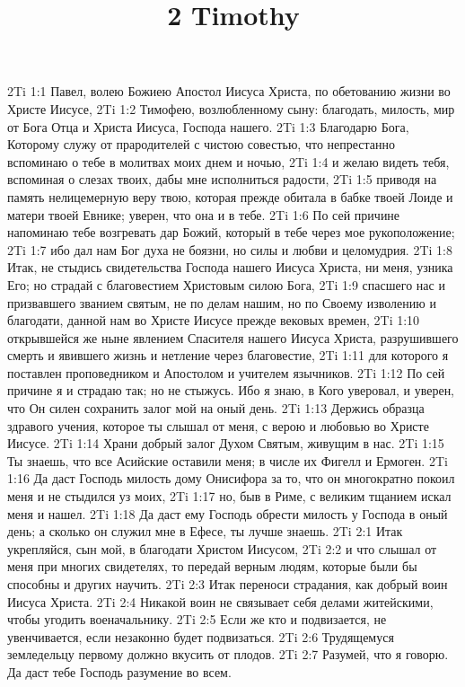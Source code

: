 

\title{2 Timothy}

2Ti 1:1  Павел, волею Божиею Апостол Иисуса Христа, по обетованию жизни во Христе Иисусе,
2Ti 1:2  Тимофею, возлюбленному сыну: благодать, милость, мир от Бога Отца и Христа Иисуса, Господа нашего.
2Ti 1:3  Благодарю Бога, Которому служу от прародителей с чистою совестью, что непрестанно вспоминаю о тебе в молитвах моих днем и ночью,
2Ti 1:4  и желаю видеть тебя, вспоминая о слезах твоих, дабы мне исполниться радости,
2Ti 1:5  приводя на память нелицемерную веру твою, которая прежде обитала в бабке твоей Лоиде и матери твоей Евнике; уверен, что она и в тебе.
2Ti 1:6  По сей причине напоминаю тебе возгревать дар Божий, который в тебе через мое рукоположение;
2Ti 1:7  ибо дал нам Бог духа не боязни, но силы и любви и целомудрия.
2Ti 1:8  Итак, не стыдись свидетельства Господа нашего Иисуса Христа, ни меня, узника Его; но страдай с благовестием Христовым силою Бога,
2Ti 1:9  спасшего нас и призвавшего званием святым, не по делам нашим, но по Своему изволению и благодати, данной нам во Христе Иисусе прежде вековых времен,
2Ti 1:10  открывшейся же ныне явлением Спасителя нашего Иисуса Христа, разрушившего смерть и явившего жизнь и нетление через благовестие,
2Ti 1:11  для которого я поставлен проповедником и Апостолом и учителем язычников.
2Ti 1:12  По сей причине я и страдаю так; но не стыжусь. Ибо я знаю, в Кого уверовал, и уверен, что Он силен сохранить залог мой на оный день.
2Ti 1:13  Держись образца здравого учения, которое ты слышал от меня, с верою и любовью во Христе Иисусе.
2Ti 1:14  Храни добрый залог Духом Святым, живущим в нас.
2Ti 1:15  Ты знаешь, что все Асийские оставили меня; в числе их Фигелл и Ермоген.
2Ti 1:16  Да даст Господь милость дому Онисифора за то, что он многократно покоил меня и не стыдился уз моих,
2Ti 1:17  но, быв в Риме, с великим тщанием искал меня и нашел.
2Ti 1:18  Да даст ему Господь обрести милость у Господа в оный день; а сколько он служил мне в Ефесе, ты лучше знаешь.
2Ti 2:1  Итак укрепляйся, сын мой, в благодати Христом Иисусом,
2Ti 2:2  и что слышал от меня при многих свидетелях, то передай верным людям, которые были бы способны и других научить.
2Ti 2:3  Итак переноси страдания, как добрый воин Иисуса Христа.
2Ti 2:4  Никакой воин не связывает себя делами житейскими, чтобы угодить военачальнику.
2Ti 2:5  Если же кто и подвизается, не увенчивается, если незаконно будет подвизаться.
2Ti 2:6  Трудящемуся земледельцу первому должно вкусить от плодов.
2Ti 2:7  Разумей, что я говорю. Да даст тебе Господь разумение во всем.
